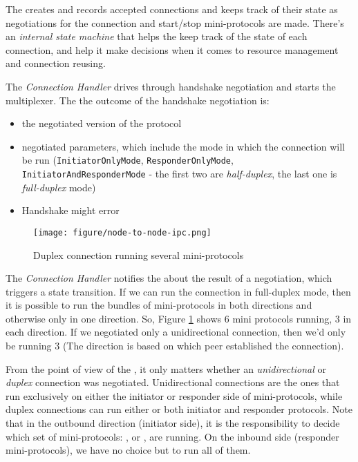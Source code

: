 The \Connmngr{} creates and records accepted connections and keeps track of their state
as negotiations for the connection and start/stop mini-protocols are made. There's an
\emph{internal state machine} that helps the \Connmngr{} keep track of the state of each
connection, and help it make decisions when it comes to resource management and
connection reusing.

The \emph{Connection Handler} drives through handshake negotiation and starts the multiplexer. The
the outcome of the handshake negotiation is:

\begin{itemize}
    \item the negotiated version of the protocol
    \item negotiated parameters, which include the mode in which the connection will be
      run (\texttt{InitiatorOnlyMode}, \texttt{ResponderOnlyMode},\\
      \texttt{InitiatorAndResponderMode} - the first two are \emph{half-duplex}, the last
      one is \emph{full-duplex} mode)
    \item Handshake might error
\end{itemize}

\begin{figure}
    \centering
    \texttt{[image: figure/node-to-node-ipc.png]}
    \caption{Duplex connection running several mini-protocols}
    \label{fig:protocol-diagram}
\end{figure}

The \emph{Connection Handler} notifies the \Connmngr{} about the result of a negotiation, which
triggers a state transition. If we can run the connection in full-duplex mode,
then it is possible to run the bundles of mini-protocols in both directions and otherwise only in one direction.
So, Figure \ref{fig:protocol-diagram} shows $6$ mini protocols running, $3$ in each direction.
If we negotiated only a unidirectional connection, then we'd only be running $3$
(The direction is based on which peer established the connection).

From the point of view of the \connmngr{}, it only
matters whether an \emph{unidirectional} or \emph{duplex} connection was negotiated.
Unidirectional connections are the ones that run exclusively on either the initiator or responder
side of mini-protocols, while duplex connections can run either or
both initiator and responder protocols. Note that in the outbound direction (initiator side),
it is the \ptopgov{} responsibility to decide which set of mini-protocols:
\established{}, \warm{} or \hot{}, are running. On the inbound side (responder
mini-protocols), we have no choice but to run all of them.

